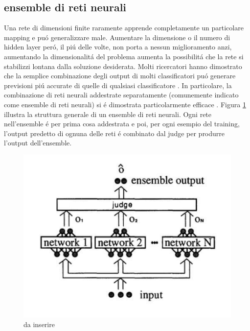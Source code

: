 \documentclass[a4paper,10pt]{article}
\begin{document}
 \subsection{ensemble di reti neurali}
 Una rete di dimensioni finite raramente apprende completamente un particolare mapping e pu\'o generalizzare male. Aumentare la dimensione o il numero di hidden layer per\'o, il pi\'u delle volte, non porta a nessun miglioramento \cite{soulie1987evaluation} anzi, aumentando la dimensionalit\'a del problema aumenta la possibilit\'a che la rete si stabilizzi lontana dalla soluzione desiderata. 
 Molti ricercatori hanno dimostrato che la semplice combinazione degli output di molti classificatori pu\'o generare previsioni pi\'u accurate di quelle di qualsiasi classificatore \cite{clemen1989combining} \cite{wolpert1992stacked}. In particolare, la combinazione di reti neurali addestrate separatamente (comunemente indicato come ensemble di reti neurali) si \'e dimostrata particolarmente efficace \cite{alpaydin1993multiple} \cite{drucker1994boosting} \cite{krogh1995neural} \cite{maclin1995combining} \cite{perrone1992soft}. 
 Figura \ref{EnsembleStructurepng} illustra la struttura generale di un ensemble di reti neurali. Ogni rete nell'ensemble \'e per prima cosa addestrata e poi, per ogni esempio del training, l'output predetto di ognuna delle reti \'e combinato dal judge per produrre l'output dell'ensemble. 
 \begin{figure}[h!]
  \centering
  \includegraphics[scale=0.3]{EnsembleStructure.png}
  \caption{da inserire}
  \label{EnsembleStructurepng}
 \end{figure}
 
\end{document}
